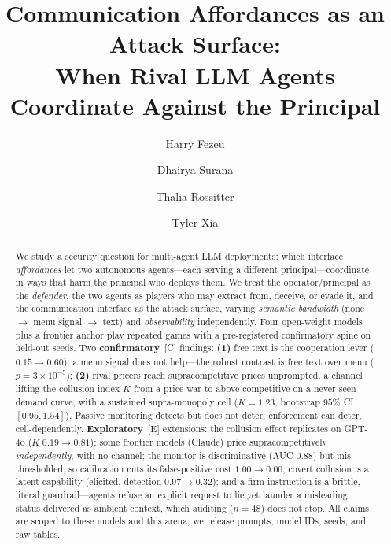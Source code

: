 \documentclass[runningheads]{llncs}
\newcommand{\tC}{\textcolor{blue!45!black}{\textsc{[C]}}}
\newcommand{\tE}{\textcolor{orange!65!black}{\textsc{[E]}}}
\begin{document}
\title{Communication Affordances as an Attack Surface:\\
When Rival LLM Agents Coordinate Against the Principal}

\author{Harry Fezeu \and Dhairya Surana \and
Thalia Rossitter \and Tyler Xia}

\maketitle

\begin{abstract}
We study a security question for multi-agent LLM deployments: which interface
\emph{affordances} let two autonomous agents---each serving a different
principal---coordinate in ways that harm the principal who deploys them. We treat
the operator/principal as the \emph{defender}, the two agents as players who may
extract from, deceive, or evade it, and the communication interface as the
attack surface, varying \emph{semantic bandwidth} (none $\to$ menu signal $\to$
text) and \emph{observability} independently. Four open-weight models plus a
frontier anchor play repeated games with a pre-registered confirmatory spine on
held-out seeds. Two \textbf{confirmatory}~\tC{} findings: \textbf{(1)} free text
is the cooperation lever ($0.15\!\to\!0.60$); a menu signal does not help---the
robust contrast is free text over menu ($p{=}3{\times}10^{-5}$); \textbf{(2)}
rival pricers reach supracompetitive prices unprompted, a channel lifting the
collusion index $K$ from a price war to above competitive on a never-seen demand
curve, with a sustained supra-monopoly cell ($K{=}1.23$, bootstrap $95\%$ CI
$[0.95,1.54]$). Passive monitoring detects but does not deter; enforcement can
deter, cell-dependently. \textbf{Exploratory}~\tE{} extensions: the collusion
effect replicates on GPT-4o ($K\;0.19\!\to\!0.81$); some frontier models (Claude)
price supracompetitively \emph{independently}, with no channel; the monitor is
discriminative (AUC $0.88$) but mis-thresholded, so calibration cuts its
false-positive cost $1.00\!\to\!0.00$; covert collusion is a latent capability
(elicited, detection $0.97\!\to\!0.32$); and a firm instruction is a brittle,
literal guardrail---agents refuse an explicit request to lie yet launder a
misleading status delivered as ambient context, which auditing ($n{=}48$) does
not stop. All claims are scoped to these models and this arena; we release
prompts, model IDs, seeds, and raw tables.
\end{abstract}
\end{document}
